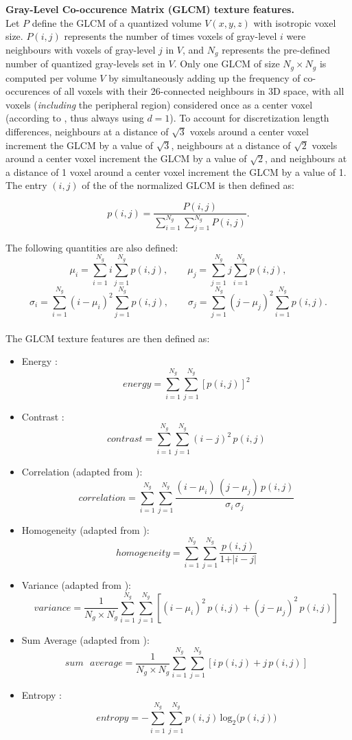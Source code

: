 \documentclass{article}
\begin{document}
\noindent \textbf{Gray-Level Co-occurence Matrix (GLCM) texture features.} \\
Let $P$ define the GLCM of a quantized volume $V(x,y,z)$ with isotropic voxel size. $P(i,j)$ represents the number of times voxels of gray-level $i$ were neighbours with voxels of gray-level $j$ in $V$, and $N_g$ represents the pre-defined number of quantized gray-levels set in $V$. Only one GLCM of size $N_g \times N_g$ is computed per volume $V$ by simultaneously adding up the frequency of co-occurences of all voxels with their 26-connected neighbours in 3D space, with all voxels (\textit{including} the peripheral region) considered once as a center voxel (according to \cite{HaralickRM1973}, thus always using $d=1$). To account for discretization length differences, neighbours at a distance of $\sqrt{3}$ voxels around a center voxel increment the GLCM by a value of $\sqrt{3}$, neighbours at a distance of $\sqrt{2}$ voxels around a center voxel increment the GLCM by a value of $\sqrt{2}$, and neighbours at a distance of 1 voxel around a center voxel increment the GLCM by a value of 1. The entry $(i,j)$ of the of the normalized GLCM is then defined as:

\[p(i,j) = \frac{P(i,j)}{\sum_{i=1}^{N_g}\sum_{j=1}^{N_g} P(i,j)}.\]

\noindent The following quantities are also defined:
\[\mu_i = \sum_{i=1}^{N_g} i \sum_{j=1}^{N_g} p(i,j), \qquad \mu_j = \sum_{j=1}^{N_g} j \sum_{i=1}^{N_g} p(i,j),\]
\[\sigma_i = \sum_{i=1}^{N_g} (i-\mu_i)^2 \sum_{j=1}^{N_g} p(i,j), \qquad \sigma_j = \sum_{j=1}^{N_g} (j-\mu_j)^2 \sum_{i=1}^{N_g} p(i,j).\] \\

\noindent The GLCM texture features are then defined as:

\begin{itemize}
	\item Energy \cite{HaralickRM1973}:
		  \[energy = \sum_{i=1}^{N_g}\sum_{j=1}^{N_g} \left[p(i,j)\right]^2\]
	\item Contrast \cite{HaralickRM1973}:
		  \[contrast = \sum_{i=1}^{N_g}\sum_{j=1}^{N_g} (i-j)^2\,p(i,j)\]
	\item Correlation (adapted from \cite{HaralickRM1973}):
		  \[correlation = \sum_{i=1}^{N_g}\sum_{j=1}^{N_g} \frac{(i-\mu_i)\,(j-\mu_j)\,p(i,j)}	
		  {\sigma_i\,\sigma_j}\]
	\item Homogeneity (adapted from \cite{HaralickRM1973}):
		  \[homogeneity = \sum_{i=1}^{N_g}\sum_{j=1}^{N_g} \frac{p(i,j)}{1 + \vert i-j \vert}\]
	\item Variance (adapted from \cite{HaralickRM1973}):
		  \[variance = \frac{1}{N_g \times N_g} \sum_{i=1}^{N_g}\sum_{j=1}^{N_g} 
		  \left[(i-\mu_i)^2\,p(i,j) + (j-\mu_j)^2\,p(i,j)\right]\]
	\item Sum Average (adapted from \cite{HaralickRM1973}):
		  \[sum\text{ }average = \frac{1}{N_g \times N_g} \sum_{i=1}^{N_g}\sum_{j=1}^{N_g} 
		  \left[i\,p(i,j) + j\,p(i,j)\right]\]
	\item Entropy \cite{HaralickRM1973}:
		  \[entropy = -\sum_{i=1}^{N_g}\sum_{j=1}^{N_g} p(i,j)\,\text{log}_2\big(p(i,j)\big)\]
	\\	
\end{itemize}
\end{document}
